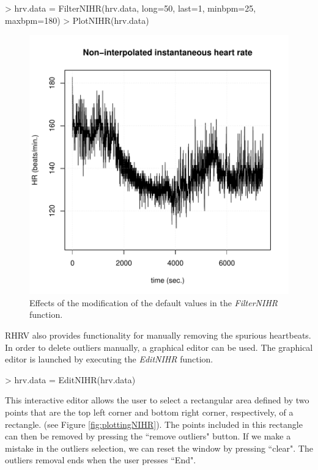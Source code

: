 \documentclass[12pt,lot, lof]{puthesis}
\begin{document}
\begin{Schunk}
\begin{Sinput}
> hrv.data = FilterNIHR(hrv.data, long=50, last=1, minbpm=25, maxbpm=180)
> PlotNIHR(hrv.data)
\end{Sinput}
\end{Schunk}
\begin{figure}[h]
\centering
\includegraphics{figures/tutorial-completeFilterNIHR}
\caption[Modifying default values in the \textit{FilterNIHR} function]{Effects 
of the modification of the default values in the \textit{FilterNIHR} 
function.\label{fig:completeFilterNIHR}}
\end{figure}


RHRV also provides functionality for manually removing the spurious heartbeats. 
In order to delete outliers manually, a graphical editor can be used. The 
graphical editor is launched by executing the  \textit{EditNIHR} function.
\begin{Schunk}
\begin{Sinput}
> hrv.data = EditNIHR(hrv.data)
\end{Sinput}
\end{Schunk}

This interactive editor allows the user to select a rectangular area defined by 
two points that are the top left corner and bottom right corner, respectively, 
of a rectangle. (see Figure 
\ref{fig:plottingNIHR}). The points included in this rectangle can then be 
removed by pressing the ``remove outliers"  button. If we make a mistake in the 
outliers selection, we can reset the window by pressing ``clear". The 
outliers removal ends when the user presses ``End".
\end{document}
